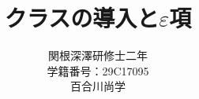 \documentclass[a4j,papersize,disablejfam,slide,30pt]{jsarticle}
\theoremstyle{mystyle}
\begin{document}
\title{\Huge クラスの導入と$\varepsilon$項}
\author{\Large 関根深澤研修士二年\\学籍番号：29C17095\\百合川尚学}
\maketitle

\tableofcontents


\end{document}
